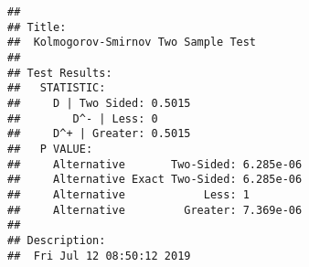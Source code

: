 \documentclass[]{article}
\begin{document}
\begin{verbatim}
## 
## Title:
##  Kolmogorov-Smirnov Two Sample Test
## 
## Test Results:
##   STATISTIC:
##     D | Two Sided: 0.5015
##        D^- | Less: 0
##     D^+ | Greater: 0.5015
##   P VALUE:
##     Alternative       Two-Sided: 6.285e-06 
##     Alternative Exact Two-Sided: 6.285e-06 
##     Alternative            Less: 1 
##     Alternative         Greater: 7.369e-06 
## 
## Description:
##  Fri Jul 12 08:50:12 2019
\end{verbatim}
\end{document}
